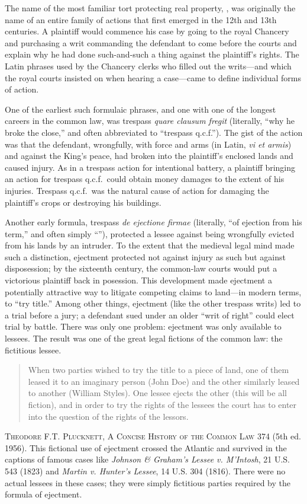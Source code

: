 The name of the most familiar tort protecting real property, ,
was originally the name of an entire family of actions that first emerged in
the 12th and 13th centuries. A plaintiff would commence his case by going to
the royal Chancery and purchasing a writ commanding the defendant to come
before the courts and explain why he had done such-and-such a thing against the
plaintiff's rights. The Latin phrases used by the Chancery clerks who filled
out the writs---and which the royal courts insisted on when hearing a
case---came to define individual forms of action.

One of the earliest such formulaic phrases, and one with one of the longest
careers in the common law, was trespass \textit{quare clausum fregit}
(literally, ``why he broke the close,'' and often abbreviated to ``trespass
q.c.f.''). The gist of the action was that the defendant, wrongfully, with
force and arms (in Latin, \textit{vi et armis}) and against the King's peace,
had broken into the plaintiff's enclosed lands and caused injury. As in a
trespass action for intentional battery, a plaintiff bringing an action for
trespass q.c.f.\ could obtain money damages to the extent of his injuries.
Trespass q.c.f.\ was the natural cause of action for damaging the plaintiff's
crops or destroying his buildings.

Another early formula, trespass \textit{de ejectione firmae} (literally, ``of
ejection from his term,'' and often simply ``''), protected
a lessee against being wrongfully evicted from his lands by an intruder. To the
extent that the medieval legal mind made such a distinction, ejectment
protected not against injury as such but against disposession; by the sixteenth
century, the common-law courts would put a victorious plaintiff back in
posession. This development made ejectment a potentially attractive way to
litigate competing claims to land---in modern terms, to ``try title.'' Among
other things, ejectment (like the other trespass writs) led to a trial before a
jury; a defendant sued under an older ``writ of right'' could elect trial by
battle. There was only one problem: ejectment was only available to lessees.
The result was one of the great legal fictions of the common law: the
fictitious lessee.

\begin{quote}
When two parties wished to try the title to a piece of land, one of them leased
it to an imaginary person (John Doe) and the other similarly leased to another
(William Styles). One lessee ejects the other (this will be all fiction), and
in order to try the rights of the lessees the court has to enter into the
question of the rights of the lessors.
\end{quote}
\textsc{Theodore F.T. Plucknett, A Concise History of the Common Law} 374 (5th
ed. 1956). This fictional use of ejectment crossed the Atlantic and survived in
the captions of famous cases like \textit{Johnson \& Graham's Lessee v.
M'Intosh}, 21 U.S. 543 (1823) and \textit{Martin v. Hunter's Lessee}, 14 U.S.
304 (1816). There were no actual lessees in these cases; they were simply
fictitious parties required by the formula of ejectment.

